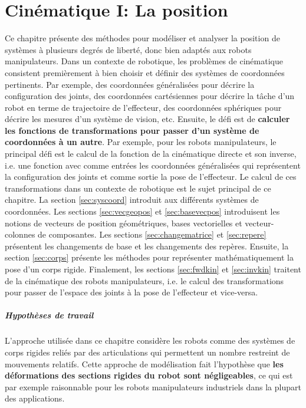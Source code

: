 \chapter{Cinématique I: La position}
\label{sec:cine1}

Ce chapitre présente des méthodes pour modéliser et analyser la position de systèmes à plusieurs degrés de liberté, donc bien adaptés aux robots manipulateurs. Dans un contexte de robotique, les problèmes de cinématique consistent premièrement à bien choisir et définir des systèmes de coordonnées pertinents. Par exemple, des coordonnées généralisées pour décrire la configuration des joints, des coordonnées cartésiennes pour décrire la tâche d'un robot en terme de trajectoire de l'effecteur, des coordonnées sphériques pour décrire les mesures d'un système de vision, etc. Ensuite, le défi est de \textbf{calculer les fonctions de transformations pour passer d'un système de coordonnées à un autre}. Par exemple, pour les robots manipulateurs, le principal défi est le calcul de la fonction de la cinématique directe et son inverse, i.e. une fonction avec comme entrées les coordonnées généralisées qui représentent la configuration des joints et comme sortie la pose de l'effecteur. Le calcul de ces transformations dans un contexte de robotique est le sujet principal de ce chapitre. La section \ref{sec:syscoord} introduit aux différents systèmes de coordonnées. Les sections \ref{sec:vecgeopos} et \ref{sec:basevecpos} introduisent les notions de vecteurs de position géométriques, bases vectorielles et vecteur-colonnes de composantes. Les sections \ref{sec:changematrice} et \ref{sec:repere} présentent les changements de base et les changements des repères. Ensuite, la section \ref{sec:corps} présente les méthodes pour représenter mathématiquement la pose d'un corps rigide. Finalement, les sections \ref{sec:fwdkin} et \ref{sec:invkin} traitent de la cinématique des robots manipulateurs, i.e. le calcul des transformations pour passer de l'espace des joints à la pose de l'effecteur et vice-versa. 

\paragraph{Hypothèses de travail} L'approche utilisée dans ce chapitre considère les robots comme des systèmes de corps rigides reliés par des articulations qui permettent un nombre restreint de mouvements relatifs. Cette approche de modélisation fait l'hypothèse que \textbf{les déformations des sections rigides du robot sont négligeables}, ce qui est par exemple raisonnable pour les robots manipulateurs industriels dans la plupart des applications.  

